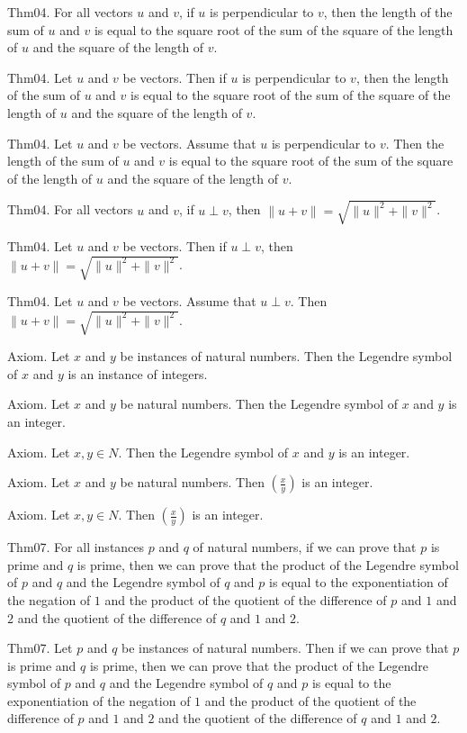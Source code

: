 \documentclass{article}
\begin{document}
Thm04. For all vectors $u$ and $v$, if $u$ is perpendicular to $v$, then the length of the sum of $u$ and $v$ is equal to the square root of the sum of the square of the length of $u$ and the square of the length of $v$.

Thm04. Let $u$ and $v$ be vectors. Then if $u$ is perpendicular to $v$, then the length of the sum of $u$ and $v$ is equal to the square root of the sum of the square of the length of $u$ and the square of the length of $v$.

Thm04. Let $u$ and $v$ be vectors. Assume that $u$ is perpendicular to $v$. Then the length of the sum of $u$ and $v$ is equal to the square root of the sum of the square of the length of $u$ and the square of the length of $v$.

Thm04. For all vectors $u$ and $v$, if $u \perp v$, then $\| u + v \| = \sqrt{ \| u \| ^{ 2}+ \| v \| ^{ 2}}$.

Thm04. Let $u$ and $v$ be vectors. Then if $u \perp v$, then $\| u + v \| = \sqrt{ \| u \| ^{ 2}+ \| v \| ^{ 2}}$.

Thm04. Let $u$ and $v$ be vectors. Assume that $u \perp v$. Then $\| u + v \| = \sqrt{ \| u \| ^{ 2}+ \| v \| ^{ 2}}$.

Axiom. Let $x$ and $y$ be instances of natural numbers. Then the Legendre symbol of $x$ and $y$ is an instance of integers.

Axiom. Let $x$ and $y$ be natural numbers. Then the Legendre symbol of $x$ and $y$ is an integer.

Axiom. Let $x , y \in N$. Then the Legendre symbol of $x$ and $y$ is an integer.

Axiom. Let $x$ and $y$ be natural numbers. Then $\left(\frac{ x }{ y }\right)$ is an integer.

Axiom. Let $x , y \in N$. Then $\left(\frac{ x }{ y }\right)$ is an integer.

Thm07. For all instances $p$ and $q$ of natural numbers, if we can prove that $p$ is prime and $q$ is prime, then we can prove that the product of the Legendre symbol of $p$ and $q$ and the Legendre symbol of $q$ and $p$ is equal to the exponentiation of the negation of $1$ and the product of the quotient of the difference of $p$ and $1$ and $2$ and the quotient of the difference of $q$ and $1$ and $2$.

Thm07. Let $p$ and $q$ be instances of natural numbers. Then if we can prove that $p$ is prime and $q$ is prime, then we can prove that the product of the Legendre symbol of $p$ and $q$ and the Legendre symbol of $q$ and $p$ is equal to the exponentiation of the negation of $1$ and the product of the quotient of the difference of $p$ and $1$ and $2$ and the quotient of the difference of $q$ and $1$ and $2$.
\end{document}
